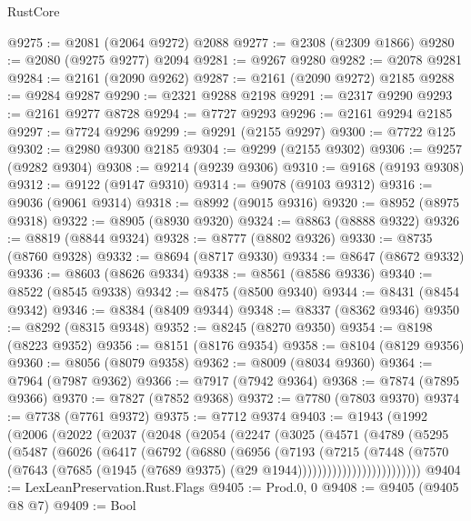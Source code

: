 \begin{lexlean}{RustCore}
\begin{coremodule}
@9275 := @2081 (@2064 @9272) @2088
@9277 := @2308 (@2309 @1866)
@9280 := @2080 (@9275 @9277) @2094
@9281 := @9267 @9280
@9282 := @2078 @9281
@9284 := @2161 (@2090 @9262)
@9287 := @2161 (@2090 @9272) @2185
@9288 := @9284 @9287
@9290 := @2321 @9288 @2198
@9291 := @2317 @9290
@9293 := @2161 @9277 @8728
@9294 := @7727 @9293
@9296 := @2161 @9294 @2185
@9297 := @7724 @9296
@9299 := @9291 (@2155 @9297)
@9300 := @7722 @125
@9302 := @2980 @9300 @2185
@9304 := @9299 (@2155 @9302)
@9306 := @9257 (@9282 @9304)
@9308 := @9214 (@9239 @9306)
@9310 := @9168 (@9193 @9308)
@9312 := @9122 (@9147 @9310)
@9314 := @9078 (@9103 @9312)
@9316 := @9036 (@9061 @9314)
@9318 := @8992 (@9015 @9316)
@9320 := @8952 (@8975 @9318)
@9322 := @8905 (@8930 @9320)
@9324 := @8863 (@8888 @9322)
@9326 := @8819 (@8844 @9324)
@9328 := @8777 (@8802 @9326)
@9330 := @8735 (@8760 @9328)
@9332 := @8694 (@8717 @9330)
@9334 := @8647 (@8672 @9332)
@9336 := @8603 (@8626 @9334)
@9338 := @8561 (@8586 @9336)
@9340 := @8522 (@8545 @9338)
@9342 := @8475 (@8500 @9340)
@9344 := @8431 (@8454 @9342)
@9346 := @8384 (@8409 @9344)
@9348 := @8337 (@8362 @9346)
@9350 := @8292 (@8315 @9348)
@9352 := @8245 (@8270 @9350)
@9354 := @8198 (@8223 @9352)
@9356 := @8151 (@8176 @9354)
@9358 := @8104 (@8129 @9356)
@9360 := @8056 (@8079 @9358)
@9362 := @8009 (@8034 @9360)
@9364 := @7964 (@7987 @9362)
@9366 := @7917 (@7942 @9364)
@9368 := @7874 (@7895 @9366)
@9370 := @7827 (@7852 @9368)
@9372 := @7780 (@7803 @9370)
@9374 := @7738 (@7761 @9372)
@9375 := @7712 @9374
@9403 := @1943
    (@1992
      (@2006
        (@2022
          (@2037
            (@2048
              (@2054
                (@2247
                  (@3025
                    (@4571
                      (@4789
                        (@5295
                          (@5487
                            (@6026
                              (@6417
                                (@6792
                                  (@6880
                                    (@6956
                                      (@7193
                                        (@7215
                                          (@7448
                                            (@7570
                                              (@7643
                                                (@7685
                                                  (@1945
                                                    (@7689 @9375)
                                                    (@29 @1944)))))))))))))))))))))))))
@9404 := LexLeanPreservation.Rust.Flags
@9405 := Prod.{0, 0}
@9408 := @9405 (@9405 @8 @7)
@9409 := Bool

\end{coremodule}
\end{lexlean}
